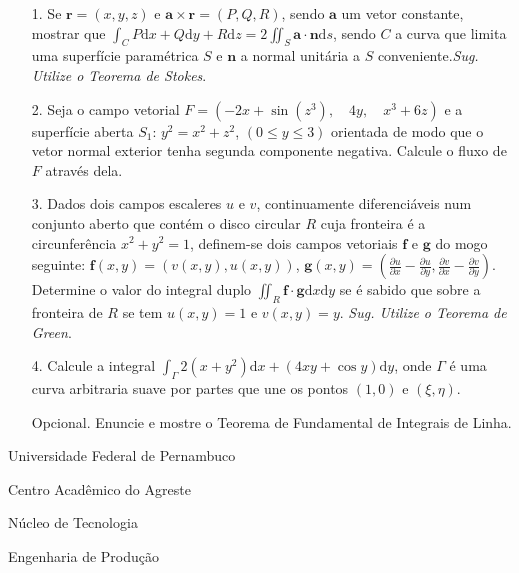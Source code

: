 \documentclass[oneside,a4paper,12pt]{article}
\newcommand{\universidade}{Universidade Federal de Pernambuco}
\newcommand{\centro}{Centro Acadêmico do Agreste}
\newcommand{\departamento}{Núcleo de Tecnologia}
\newcommand{\curso}{Engenharia de Produção}
\begin{document}
\begin{itemize}
\item[1.]  Se $\textbf{r}=(x,y,z)$ e $\textbf{a}\times \textbf{r}=(P,Q,R)$, sendo $\textbf{a}$ um vetor constante, mostrar que $\int_{C} P\mathrm{d}x+Q\mathrm{d}y+R\mathrm{d}z=2\iint_{S}\textbf{a}\cdot \textbf{n}\mathrm{d}s$, sendo $C$ a curva que limita uma superfície paramétrica $S$ e $\textbf{n}$ a normal unitária a $S$ conveniente.\textit{Sug. Utilize o Teorema de Stokes}.
\end{itemize}
\begin{itemize}
\item[2.] Seja o campo vetorial $F=(-2x+\sin(z^{3}),\quad 4y,\quad x^{3}+6z)$ e a superfície aberta $S_{1}$: $y^{2}=x^{2}+z^{2}$, $(0\leq y \leq 3)$ orientada de modo que o vetor normal exterior tenha segunda componente negativa. Calcule o fluxo de $F$ através dela. 
 \end{itemize}
 \begin{itemize}
\item [3.] Dados dois campos escaleres $u$ e $v$, continuamente diferenciáveis num conjunto aberto que contém o disco circular $R$ cuja fronteira é a circunferência $x^{2}+y^{2}=1$, definem-se dois campos vetoriais $\textbf{f}$ e $\textbf{g}$ do mogo seguinte: $\textbf{f}(x,y)=(v(x,y), u(x,y))$, $\textbf{g}(x,y)=(\frac{\partial u}{\partial x}-\frac{\partial u}{\partial y}, \frac{\partial v}{\partial x}-\frac{\partial v}{\partial y})$. Determine o valor do integral duplo $\iint_{R} \textbf{f}\cdot\textbf{g}\mathrm{d}x\mathrm{d}y$ se é sabido que sobre a fronteira de $R$ se tem $u(x,y)=1$ e $v(x,y)=y$. \textit{Sug. Utilize o Teorema de Green}.
\end{itemize}
\begin{itemize}
\item[4.] Calcule a integral $\int_{\Gamma}2(x+y^{2}) \mathrm{d}x+(4xy+\cos y)\mathrm{d}y$, onde $\Gamma$ é uma curva arbitraria suave por partes que une os pontos $(1,0)$ e $(\xi, \eta)$.
\end{itemize}
\begin{itemize}
	\item[Opcional.] Enuncie e mostre o Teorema de Fundamental de Integrais de Linha.
\end{itemize}

	\flushbottom
	\flushright
     \begin{center}
     	\vspace{10pt}
     	
     	\universidade
     	\par
     	\centro
     	\par
     	\departamento
     	\par
     	\curso
     	\par
     	\vspace{08pt}
     	\\
     \end{center}
     
\end{document}
